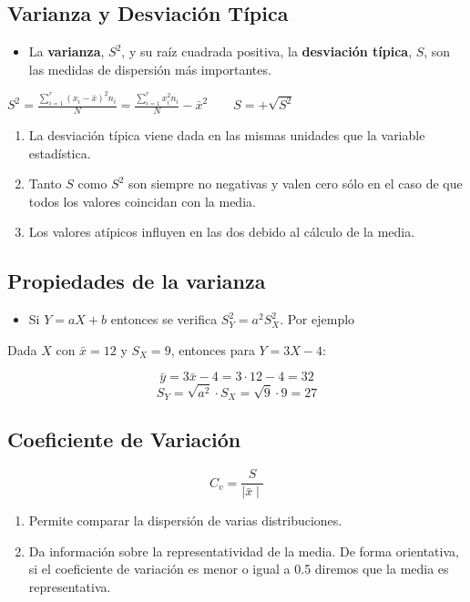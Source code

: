 \documentclass[]{book}
\providecommand{\tightlist}{%
  \setlength{\itemsep}{0pt}\setlength{\parskip}{0pt}}
\theoremstyle{definition}
\theoremstyle{definition}
\theoremstyle{definition}
\theoremstyle{remark}
\begin{document}
\subsection{Varianza y Desviación
Típica}\label{varianza-y-desviacion-tipica}

\begin{itemize}
\tightlist
\item
  La \textbf{varianza}, \(S^2\), y su raíz cuadrada positiva, la
  \textbf{desviación típica}, \(S\), son las medidas de dispersión más
  importantes.
\end{itemize}

\(S^2 = \frac{\sum_{i=1}^r ( x_i - \bar{x})^2 n_i}{N} = \frac{\sum_{i=1}^r x_i^2 n_i}{N} - \bar{x}^2 \qquad S=+\sqrt{S^2}\)

\begin{enumerate}
\def\labelenumi{\arabic{enumi}.}
\item
  La desviación típica viene dada en las mismas unidades que la variable
  estadística.
\item
  Tanto \(S\) como \(S^2\) son siempre no negativas y valen cero sólo en
  el caso de que todos los valores coincidan con la media.
\item
  Los valores atípicos influyen en las dos debido al cálculo de la
  media.
\end{enumerate}

\subsection{Propiedades de la
varianza}\label{propiedades-de-la-varianza}

\begin{itemize}
\tightlist
\item
  Si \(Y=aX + b\) entonces se verifica \(S_Y^2 = a^2 S_X^2\). Por
  ejemplo
\end{itemize}

Dada \(X\) con \(\bar{x}=12\) y \(S_X=9\), entonces para \(Y=3X-4\):

\[\bar{y}=3\bar{x}-4=3\cdot 12-4=32\]
\[S_Y=\sqrt{a ^2}\cdot S_X=\sqrt{9}\cdot 9=27\]

\subsection{Coeficiente de Variación}\label{coeficiente-de-variacion}

\[C_v = \frac{S}{\mid \bar{x}\mid}\]

\begin{enumerate}
\def\labelenumi{\arabic{enumi}.}
\item
  Permite comparar la dispersión de varias distribuciones.
\item
  Da información sobre la representatividad de la media. De forma
  orientativa, si el coeficiente de variación es menor o igual a 0.5
  diremos que la media es representativa.
\end{enumerate}
\end{document}
